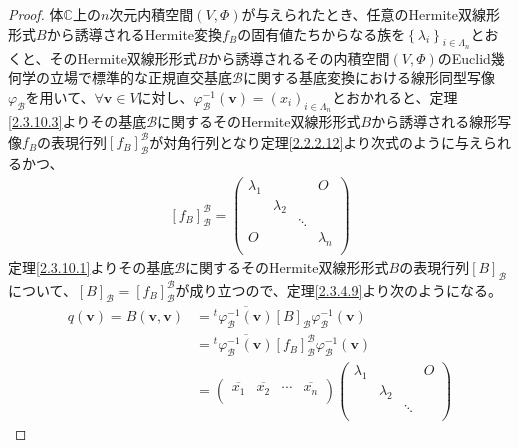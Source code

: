 \documentclass[dvipdfmx]{jsarticle}
\begin{document}
\begin{proof}
体$\mathbb{C}$上の$n$次元内積空間$(V,\varPhi)$が与えられたとき、任意のHermite双線形形式$B$から誘導されるHermite変換$f_{B}$の固有値たちからなる族を$\left\{ \lambda_{i} \right\}_{i \in \varLambda_{n}}$とおくと、そのHermite双線形形式$B$から誘導されるその内積空間$(V,\varPhi)$のEuclid幾何学の立場で標準的な正規直交基底$\mathcal{B}$に関する基底変換における線形同型写像$\varphi_{\mathcal{B}}$を用いて、$\forall\mathbf{v} \in V$に対し、$\varphi_{\mathcal{B}}^{- 1}\left( \mathbf{v} \right) = \left( x_{i} \right)_{i \in \varLambda_{n}}$とおかれると、定理\ref{2.3.10.3}よりその基底$\mathcal{B}$に関するそのHermite双線形形式$B$から誘導される線形写像$f_{B}$の表現行列$\left[ f_{B} \right]_{\mathcal{B}}^{\mathcal{B}}$が対角行列となり定理\ref{2.2.2.12}より次式のように与えられるかつ、
\begin{align*}
\left[ f_{B} \right]_{\mathcal{B}}^{\mathcal{B}} = \begin{pmatrix}
\lambda_{1} & \  & \  & O \\
\  & \lambda_{2} & \  & \  \\
\  & \  & \ddots & \  \\
O & \  & \  & \lambda_{n} \\
\end{pmatrix}
\end{align*}
定理\ref{2.3.10.1}よりその基底$\mathcal{B}$に関するそのHermite双線形形式$B$の表現行列$[ B]_{\mathcal{B}}$について、$[ B]_{\mathcal{B}} = \left[ f_{B} \right]_{\mathcal{B}}^{\mathcal{B}}$が成り立つので、定理\ref{2.3.4.9}より次のようになる。
\begin{align*}
q\left( \mathbf{v} \right) = B\left( \mathbf{v},\mathbf{v} \right) &={}^{t}\overline{\varphi_{\mathcal{B}}^{- 1}\left( \mathbf{v} \right)}[ B]_{\mathcal{B}}\varphi_{\mathcal{B}}^{- 1}\left( \mathbf{v} \right)\\
&={}^{t}\overline{\varphi_{\mathcal{B}}^{- 1}\left( \mathbf{v} \right)}\left[ f_{B} \right]_{\mathcal{B}}^{\mathcal{B}}\varphi_{\mathcal{B}}^{- 1}\left( \mathbf{v} \right)\\
&= \begin{pmatrix}
\overline{x_{1}} & \overline{x_{2}} & \cdots & \overline{x_{n}} \\
\end{pmatrix}\begin{pmatrix}
\lambda_{1} & \  & \  & O \\
\  & \lambda_{2} & \  & \  \\
\  & \  & \ddots & \  \\

\end{pmatrix}
\end{align*}
\end{proof}
\end{document}
